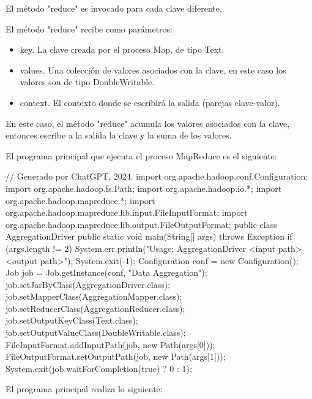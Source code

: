 El método "reduce" es invocado para cada clave diferente.

El método "reduce" recibe como parámetros:

\begin{itemize}
\item key. La clave creada por el proceso Map, de tipo Text.
\item values. Una colección de valores asociados con la clave, en este caso los valores son de tipo DoubleWritable.
\item context. El contexto donde se escribirá la salida (parejas clave-valor).
\end{itemize}

En este caso, el método "reduce" acumula los valores asociados con la clave, entonces escribe a la salida la clave y la suma de los valores.

El programa principal que ejecuta el proceso MapReduce es el siguiente:

\begin{SourceCode}
// Generado por ChatGPT, 2024.
import org.apache.hadoop.conf.Configuration;
import org.apache.hadoop.fs.Path;
import org.apache.hadoop.io.*;
import org.apache.hadoop.mapreduce.*;
import org.apache.hadoop.mapreduce.lib.input.FileInputFormat;
import org.apache.hadoop.mapreduce.lib.output.FileOutputFormat;
public class AggregationDriver {
public static void main(String[] args) throws Exception {
if (args.length != 2) {
    System.err.println("Usage: AggregationDriver <input path> <output path>");
    System.exit(-1);
}
Configuration conf = new Configuration();
Job job = Job.getInstance(conf, "Data Aggregation");
job.setJarByClass(AggregationDriver.class);
job.setMapperClass(AggregationMapper.class);
job.setReducerClass(AggregationReducer.class);
job.setOutputKeyClass(Text.class);
job.setOutputValueClass(DoubleWritable.class);
FileInputFormat.addInputPath(job, new Path(args[0]));
FileOutputFormat.setOutputPath(job, new Path(args[1]));
System.exit(job.waitForCompletion(true) ? 0 : 1);
}
}
\end{SourceCode}

El programa principal realiza lo siguiente:

